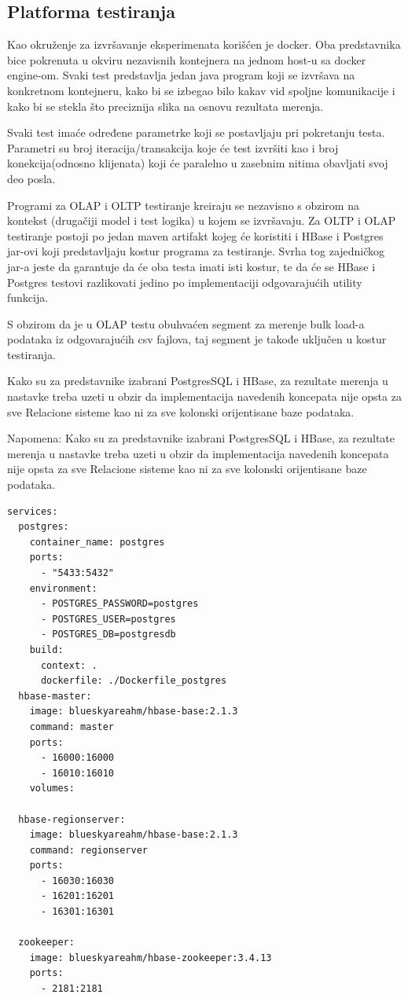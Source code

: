 \documentclass[12pt,oneside]{memoir}
\begin{document}
\subsection{Platforma testiranja}

Kao okruženje za izvršavanje eksperimenata korišćen je docker.  Oba predstavnika bice pokrenuta u okviru nezavisnih kontejnera na jednom host-u sa docker engine-om. Svaki test predstavlja jedan java program koji se izvršava na konkretnom kontejneru, kako bi se izbegao bilo kakav vid spoljne komunikacije i kako bi se stekla što preciznija slika na osnovu rezultata merenja.  

Svaki test imaće određene parametrke koji se postavljaju pri pokretanju testa. Parametri su broj iteracija/transakcija koje će test izvršiti kao i broj konekcija(odnosno klijenata) koji će paralelno u zasebnim nitima obavljati svoj deo posla.

Programi za OLAP i OLTP testiranje kreiraju se nezavisno s obzirom na kontekst (drugačiji model i test logika) u kojem se izvršavaju. Za OLTP i OLAP testiranje postoji po jedan maven artifakt kojeg će koristiti i HBase i Postgres jar-ovi koji predstavljaju kostur programa za testiranje. Svrha tog zajedničkog jar-a jeste da garantuje da će oba testa imati isti kostur, te da će se HBase i Postgres testovi razlikovati jedino po implementaciji  odgovarajućih utility funkcija. 


S obzirom da je u OLAP testu obuhvaćen segment za merenje bulk load-a podataka iz odgovarajućih csv fajlova, taj segment je takođe uključen u kostur testiranja.

Kako su za predstavnike izabrani PostgresSQL i HBase,  za rezultate merenja u nastavke treba uzeti u obzir da implementacija navedenih koncepata nije opsta za sve Relacione sisteme kao ni za sve kolonski orijentisane baze podataka.


Napomena: Kako su za predstavnike izabrani PostgresSQL i HBase,  za rezultate merenja u nastavke treba uzeti u obzir da implementacija navedenih koncepata nije opsta za sve Relacione sisteme kao ni za sve kolonski orijentisane baze podataka.



\begin{lstlisting}[title={docker-compose.yml},captionpos=t]
services: 
  postgres:
    container_name: postgres
    ports:
      - "5433:5432"
    environment:
      - POSTGRES_PASSWORD=postgres
      - POSTGRES_USER=postgres
      - POSTGRES_DB=postgresdb
    build:
      context: .
      dockerfile: ./Dockerfile_postgres
  hbase-master:
    image: blueskyareahm/hbase-base:2.1.3
    command: master
    ports:
      - 16000:16000
      - 16010:16010
    volumes:

  hbase-regionserver:
    image: blueskyareahm/hbase-base:2.1.3
    command: regionserver
    ports:
      - 16030:16030
      - 16201:16201
      - 16301:16301

  zookeeper:
    image: blueskyareahm/hbase-zookeeper:3.4.13
    ports:
      - 2181:2181
\end{lstlisting}
\end{document}
